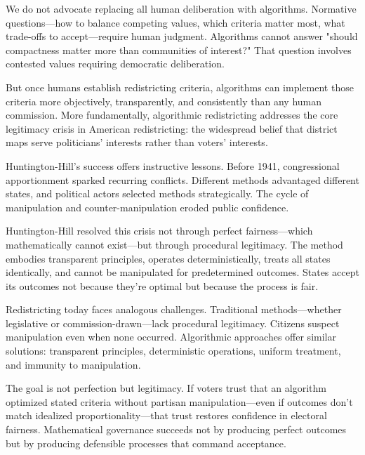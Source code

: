We do not advocate replacing all human deliberation with algorithms. Normative questions—how to balance competing values, which criteria matter most, what trade-offs to accept—require human judgment. Algorithms cannot answer "should compactness matter more than communities of interest?" That question involves contested values requiring democratic deliberation.

But once humans establish redistricting criteria, algorithms can implement those criteria more objectively, transparently, and consistently than any human commission. More fundamentally, algorithmic redistricting addresses the core legitimacy crisis in American redistricting: the widespread belief that district maps serve politicians' interests rather than voters' interests.

Huntington-Hill's success offers instructive lessons. Before 1941, congressional apportionment sparked recurring conflicts. Different methods advantaged different states, and political actors selected methods strategically. The cycle of manipulation and counter-manipulation eroded public confidence.

Huntington-Hill resolved this crisis not through perfect fairness—which mathematically cannot exist—but through procedural legitimacy. The method embodies transparent principles, operates deterministically, treats all states identically, and cannot be manipulated for predetermined outcomes. States accept its outcomes not because they're optimal but because the process is fair.

Redistricting today faces analogous challenges. Traditional methods—whether legislative or commission-drawn—lack procedural legitimacy. Citizens suspect manipulation even when none occurred. Algorithmic approaches offer similar solutions: transparent principles, deterministic operations, uniform treatment, and immunity to manipulation.

The goal is not perfection but legitimacy. If voters trust that an algorithm optimized stated criteria without partisan manipulation—even if outcomes don't match idealized proportionality—that trust restores confidence in electoral fairness. Mathematical governance succeeds not by producing perfect outcomes but by producing defensible processes that command acceptance.
